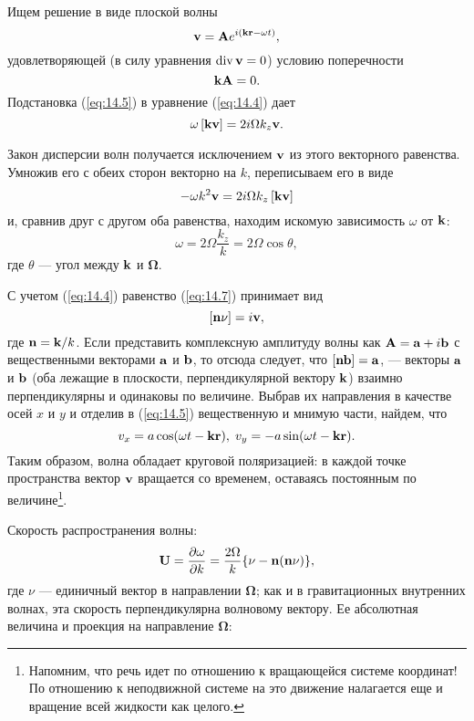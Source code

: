 Ищем решение в виде плоской волны
\begin{equation}
   \label{eq:14.5}
   { \mathbf{v} } = \mathbf{A} e^{i(\mathbf{kr} - \omega t)},
\end{equation}
удовлетворяющей (в силу уравнения $\mathop{\mathrm{div}}\nolimits{ \mathbf{v} } = 0$) условию поперечности
\begin{equation}
   \label{eq:14.6}
   \mathbf{kA} = 0.
\end{equation}
Подстановка (\ref{eq:14.5}) в уравнение (\ref{eq:14.4}) дает
\begin{equation}
   \label{eq:14.7}
   \omega \left\lbrack \mathbf{kv} \right\rbrack =
   2i\Omega k_z {\mathbf{v}}.
\end{equation}

Закон дисперсии волн получается исключением ${\mathbf{v}}$ из этого векторного равенства.
Умножив его с обеих сторон векторно на $k$, переписываем его в виде
\[
   - \omega k^2{\mathbf{v}} = 2i\Omega k_z \left\lbrack \mathbf{kv} \right\rbrack
\]
и, сравнив друг с другом оба равенства, находим искомую зависимость $\omega$ от
$\mathbf{k}$:
\begin{equation}
   \label{eq:14.8}
   \omega = 2\Omega \frac{k_z}{k} = 2\Omega\cos\theta,
\end{equation}
где $\theta$ — угол между $\mathbf{k}$ и $\bm\Omega$.

С учетом (\ref{eq:14.4}) равенство (\ref{eq:14.7}) принимает вид
\[
   \left\lbrack \mathbf{n\nu} \right\rbrack = i{\mathbf{v}},
\]
где $\mathbf{n} = \mathbf{k}/k$. Если представить комплексную амплитуду волны как
$\mathbf{A} = \mathbf{a} + i \mathbf{b}$ с вещественными векторами $\mathbf{a}$ и $\mathbf{b}$,
то отсюда следует, что $\left\lbrack \mathbf{nb} \right\rbrack = \mathbf{a}$, —
векторы $\mathbf{a}$ и $\mathbf{b}$ (оба лежащие в плоскости, перпендикулярной вектору
$\mathbf{k}$) взаимно перпендикулярны и одинаковы по величине. Выбрав их
направления в качестве осей $x$ и $y$ и отделив в (\ref{eq:14.5}) вещественную и мнимую
части, найдем, что
\[
   v_x =   a\cos(\omega t - \mathbf{kr}),\;
   v_y = - a\sin(\omega t - \mathbf{kr}).
\]
Таким образом, волна обладает круговой поляризацией: в каждой точке пространства
вектор ${\mathbf{v}}$ вращается со временем, оставаясь постоянным по величине\footnote{Напомним,
что речь идет по отношению к вращающейся системе координат! По отношению к неподвижной
системе на это движение налагается еще и вращение всей жидкости как целого.}.

Скорость распространения волны:
\begin{equation}
   \label{eq:14.9}
   \mathbf{U} = \frac{\partial{\omega}}{\partial{k}} = \frac{2\Omega}{k}\lbrace \nu - \mathbf{n(n\nu)} \rbrace,
\end{equation}
где $\nu$ — единичный вектор в направлении $\bm\Omega$; как и в гравитационных
внутренних волнах, эта скорость перпендикулярна волновому вектору. Ее абсолютная
величина и проекция на направление $\bm\Omega$:

